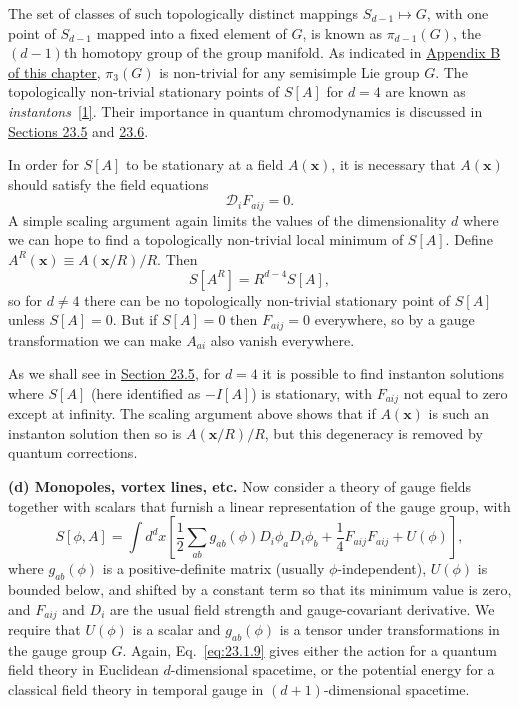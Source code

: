 The set of classes of such topologically distinct mappings
$S_{d-1}\mapsto G$, with one point of $S_{d-1}$ mapped into a fixed element
of $G$, is known as $\pi_{d-1}(G)$, the $(d-1)$th homotopy group of the
group manifold. As indicated in
\hyperref[app:23.B]{Appendix B of this chapter}, $\pi_3(G)$ is non-trivial
for any semisimple Lie group $G$. The topologically non-trivial stationary
points of $S[A]$ for $d=4$ are known as
\emph{instantons}~\hyperref[ch23-ref-1]{[1]}. Their importance in quantum
chromodynamics is discussed in \hyperref[sec:23.5]{Sections 23.5} and
\hyperref[sec:23.6]{23.6}.

In order for $S[A]$ to be stationary at a field $A(\mathbf{x})$, it is
necessary that $A(\mathbf{x})$ should satisfy the field equations
\begin{equation}
 \mathcal D_iF_{a ij}=0.
 \tag{23.1.8}\label{eq:23.1.8}
\end{equation}
A simple scaling argument again limits the values of the dimensionality $d$
where we can hope to find a topologically non-trivial local minimum of
$S[A]$. Define $A^R(\mathbf{x})\equiv A(\mathbf{x}/R)/R$. Then
\[
 S[A^R]=R^{d-4}S[A],
\]
so for $d\ne4$ there can be no topologically non-trivial stationary point of
$S[A]$ unless $S[A]=0$. But if $S[A]=0$ then
$F_{a ij}=0$ everywhere, so by a gauge transformation we can make
$A_{a i}$ also vanish everywhere.

As we shall see in \hyperref[sec:23.5]{Section 23.5}, for $d=4$ it is
possible to find instanton solutions where $S[A]$ (here identified as
$-I[A]$) is stationary, with $F_{a ij}$ not equal to zero except at
infinity. The scaling argument above shows that if $A(\mathbf{x})$ is such
an instanton solution then so is $A(\mathbf{x}/R)/R$, but this degeneracy
is removed by quantum corrections.

\noindent\textbf{(d) Monopoles, vortex lines, etc.} Now consider a theory of
gauge fields together with scalars that furnish a linear representation of
the gauge group, with
\begin{equation}
 S[\phi,A]=\int d^d x\left[
  \frac{1}{2}\sum_{ab}g_{ab}(\phi)D_i\phi_aD_i\phi_b
  +\frac{1}{4}F_{a ij}F_{a ij}+U(\phi)
 \right],
 \tag{23.1.9}\label{eq:23.1.9}
\end{equation}
where $g_{ab}(\phi)$ is a positive-definite matrix (usually
$\phi$-independent), $U(\phi)$ is bounded below, and shifted by a constant
term so that its minimum value is zero, and $F_{a ij}$ and $D_i$ are
the usual field strength and gauge-covariant derivative. We require that
$U(\phi)$ is a scalar and $g_{ab}(\phi)$ is a tensor under transformations
in the gauge group $G$. Again, Eq.~\eqref{eq:23.1.9} gives either the action
for a quantum field theory in Euclidean $d$-dimensional spacetime, or the
potential energy for a classical field theory in temporal gauge in
$(d+1)$-dimensional spacetime.

